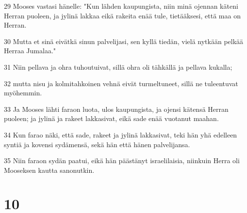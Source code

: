 \par 29 Mooses vastasi hänelle: "Kun lähden kaupungista, niin minä ojennan käteni Herran puoleen, ja jylinä lakkaa eikä rakeita enää tule, tietääksesi, että maa on Herran.
\par 30 Mutta et sinä eivätkä sinun palvelijasi, sen kyllä tiedän, vielä nytkään pelkää Herraa Jumalaa."
\par 31 Niin pellava ja ohra tuhoutuivat, sillä ohra oli tähkällä ja pellava kukalla;
\par 32 mutta nisu ja kolmitahkoinen vehnä eivät turmeltuneet, sillä ne tuleentuvat myöhemmin.
\par 33 Ja Mooses lähti faraon luota, ulos kaupungista, ja ojensi kätensä Herran puoleen; ja jylinä ja rakeet lakkasivat, eikä sade enää vuotanut maahan.
\par 34 Kun farao näki, että sade, rakeet ja jylinä lakkasivat, teki hän yhä edelleen syntiä ja kovensi sydämensä, sekä hän että hänen palvelijansa.
\par 35 Niin faraon sydän paatui, eikä hän päästänyt israelilaisia, niinkuin Herra oli Mooseksen kautta sanonutkin.

\chapter{10}

